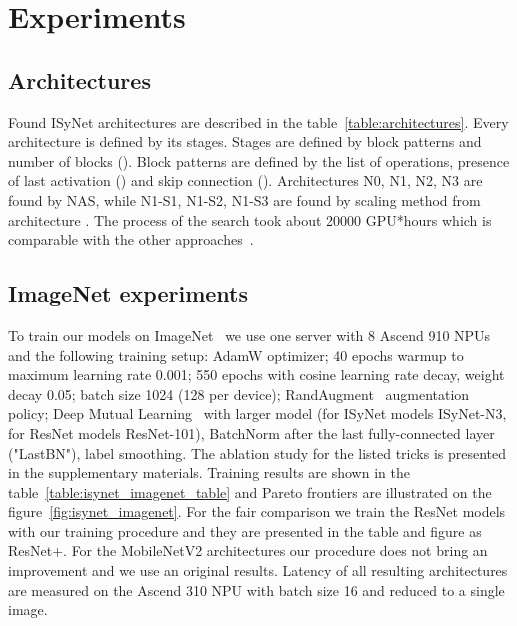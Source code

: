 \documentclass[letterpaper]{article}
\begin{document}
\section{Experiments}
\subsection{Architectures}
Found ISyNet architectures are described in the table~\ref{table:architectures}.
Every architecture is defined by its stages.
Stages are defined by block patterns and number of blocks ().
Block patterns are defined by the list of operations, presence of last activation () and skip connection ().
Architectures N0, N1, N2, N3 are found by NAS, while N1-S1, N1-S2, N1-S3 are found by scaling method from architecture . The process of the search took about 20000 GPU*hours which is comparable with the other approaches~\cite{NASSurvey}.

\subsection{ImageNet experiments}

To train our models on ImageNet~\cite{ILSVRC15} we use one server with 8 Ascend 910 NPUs and the following training setup: AdamW optimizer; 40 epochs warmup to maximum learning rate 0.001; 550 epochs with cosine learning rate decay,  weight decay 0.05; batch size 1024 (128 per device); RandAugment~\cite{cubuk2019randaugment} augmentation policy; Deep Mutual Learning~\cite{zhang2017deep} with larger model (for ISyNet models ISyNet-N3, for ResNet models ResNet-101), BatchNorm after the last fully-connected layer ("LastBN"), label smoothing.
The ablation study for the listed tricks is presented in the supplementary materials.
Training results are shown in the table~\ref{table:isynet_imagenet_table} and Pareto frontiers are illustrated on the figure~\ref{fig:isynet_imagenet}. For the fair comparison we train the ResNet models with our training procedure and they are presented in the table and figure as ResNet+. For the MobileNetV2 architectures our procedure does not bring an improvement and we use an original results.
Latency of all resulting architectures are measured on the Ascend 310 NPU with batch size 16 and reduced to a single image.
\end{document}
